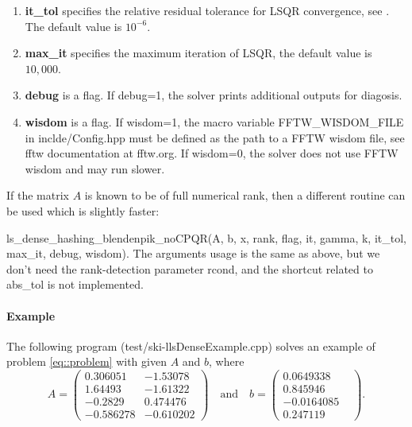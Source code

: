 \documentclass[english,11pt]{article}
\begin{document}
\begin{itemize}
\begin{enumerate}
			\item {\bf it_tol} specifies the relative residual tolerance for LSQR convergence, see \cite{Paige:1982aa}. The default value is $10^{-6}$.

			 \item {\bf max_it} specifies the maximum iteration of LSQR, the default value is $10,000$. 


			 \item {\bf debug} is a flag. If debug=1, the solver prints additional outputs for diagosis. 

			 \item {\bf wisdom} is a flag. If wisdom=1, the macro variable FFTW_WISDOM_FILE in inclde/Config.hpp must be defined as the path to a FFTW wisdom file, see fftw documentation at fftw.org. If wisdom=0, the solver does not use FFTW wisdom and may run slower. 
		\end{enumerate}
		

	\end{itemize}


If the matrix $A$ is known to be of full numerical rank, then a different routine can be used which is slightly faster:

ls_dense_hashing_blendenpik_noCPQR(A, b, x, rank, flag, it, gamma, k, it_tol, max_it, debug, wisdom). The arguments usage is the same as above, but we don't need the rank-detection parameter rcond, and the shortcut related to abs_tol is not implemented.

\paragraph{Example}

The following program (test/ski-llsDenseExample.cpp) solves an example of problem \eqref{eq::problem} with given $A$ and $b$, where 
\begin{equation}
A = \begin{pmatrix}
0.306051 & -1.53078 \\
1.64493 & -1.61322 \\
-0.2829 & 0.474476	\\
-0.586278 & -0.610202 
\end{pmatrix} \quad \text{and} \quad 
b = \begin{pmatrix}
0.0649338 \\
0.845946 \\
-0.0164085\\
0.247119 & 
\end{pmatrix}.
\end{equation}
\end{document}
